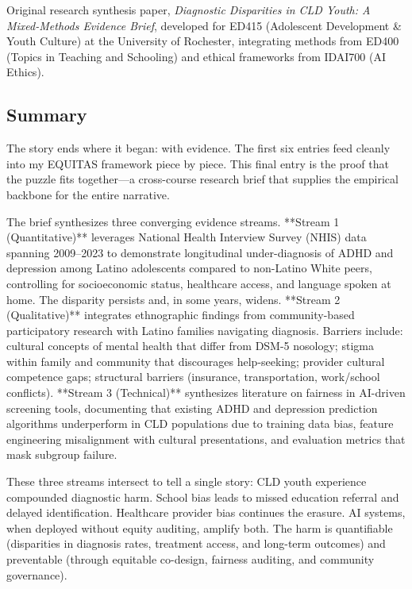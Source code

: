 \documentclass[12pt,twoside]{article}
\begin{document}
Original research synthesis paper, \textit{Diagnostic Disparities in CLD Youth: A Mixed-Methods Evidence Brief}, developed for ED415 (Adolescent Development \& Youth Culture) at the University of Rochester, integrating methods from ED400 (Topics in Teaching and Schooling) and ethical frameworks from IDAI700 (AI Ethics).

\subsection*{Summary}

The story ends where it began: with evidence. The first six entries feed cleanly into my EQUITAS framework piece by piece. This final entry is the proof that the puzzle fits together---a cross-course research brief that supplies the empirical backbone for the entire narrative.

The brief synthesizes three converging evidence streams. **Stream 1 (Quantitative)** leverages National Health Interview Survey (NHIS) data spanning 2009--2023 to demonstrate longitudinal under-diagnosis of ADHD and depression among Latino adolescents compared to non-Latino White peers, controlling for socioeconomic status, healthcare access, and language spoken at home. The disparity persists and, in some years, widens. **Stream 2 (Qualitative)** integrates ethnographic findings from community-based participatory research with Latino families navigating diagnosis. Barriers include: cultural concepts of mental health that differ from DSM-5 nosology; stigma within family and community that discourages help-seeking; provider cultural competence gaps; structural barriers (insurance, transportation, work/school conflicts). **Stream 3 (Technical)** synthesizes literature on fairness in AI-driven screening tools, documenting that existing ADHD and depression prediction algorithms underperform in CLD populations due to training data bias, feature engineering misalignment with cultural presentations, and evaluation metrics that mask subgroup failure.

These three streams intersect to tell a single story: CLD youth experience compounded diagnostic harm. School bias leads to missed education referral and delayed identification. Healthcare provider bias continues the erasure. AI systems, when deployed without equity auditing, amplify both. The harm is quantifiable (disparities in diagnosis rates, treatment access, and long-term outcomes) and preventable (through equitable co-design, fairness auditing, and community governance).
\end{document}
